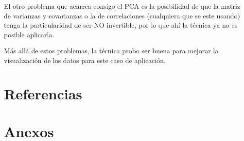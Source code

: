 \documentclass[11pt, letterpaper]{article}
\begin{document}
El otro problema que acarrea consigo el PCA es la posibilidad de que la matriz de varianzas y covarianzas o la de correlaciones (cualquiera que se este usando) tenga la particularidad de ser NO invertible, por lo que ahí la técnica ya no es posible aplicarla.

Más allá de estos problemas, la técnica probo ser buena para mejorar la visualización de los datos para este caso de aplicación.

\newpage

	
\section{Referencias}  %

\newpage
	
\section{Anexos}	
\end{document}
